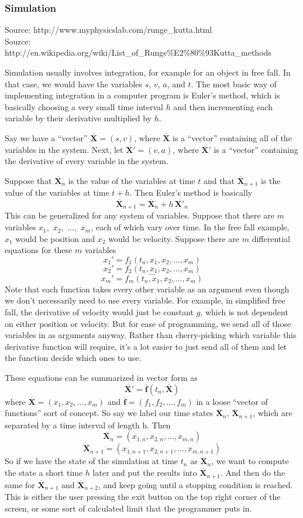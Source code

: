 \documentclass[12pt]{article}
\newcommand{\bfvec}[1]{\overline{\mathbf{#1}}}
\begin{document}
	\subsubsection*{Simulation}
	
	Source: http://www.myphysicslab.com/runge\_kutta.html \\
	Source: http://en.wikipedia.org/wiki/List\_of\_Runge\%E2\%80\%93Kutta\_methods
	
	Simulation usually involves integration, for example for an object in free fall. In that case, we would have the variables $s$, $v$, $a$, and $t$. The most basic way of implementing integration in a computer program is Euler's method, which is basically choosing a very small time interval $h$ and then incrementing each variable by their derivative multiplied by $h$.

	Say we have a ``vector'' $\bfvec{X} = (s, v)$, where $\bfvec{X}$ is a ``vector'' containing all of the variables in the system. Next, let $\bfvec{X'} = (v, a)$, where $\bfvec{X'}$ is a ``vector'' containing the derivative of every variable in the system.

	Suppose that $\bfvec{X}_n$ is the value of the variables at time $t$ and that $\bfvec{X}_{n+1}$ is the value of the variables at time $t+h$. Then Euler's method is basically
			$$\bfvec{X}_{n+1} = \bfvec{X}_n + h\,\bfvec{X'}_n$$			
	This can be generalized for any system of variables. Suppose that there are $m$ variables $x_1$,~$x_2$,~...,~$x_m$, each of which vary over time. In the free fall example, $x_1$ would be position and $x_2$ would be velocity. Suppose there are $m$ differential equations for these $m$ variables
			$$x_1' = f_1(t_n, x_1,x_2,...,x_m)$$
			$$x_2' = f_2(t_n, x_1,x_2,...,x_m)$$
			$$...$$
			$$x_m' = f_m(t_n, x_1,x_2,...,x_m)$$
	Note that each function takes every other variable as an argument even though we don't necessarily need to use every variable. For example, in simplified free fall, the derivative of velocity would just be constant $g$, which is not dependent on either position or velocity. But for ease of programming, we send all of those variables in as arguments anyway. Rather than cherry-picking which variable this derivative function will require, it's a lot easier to just send all of them and let the function decide which ones to use. 
	
	These equations can be summarized in vector form as
			$$\bfvec{X'} = \bfvec{f}(t_n, \bfvec{X})$$
	where $\bfvec{X} = (x_1,x_2,...,x_m)$ and $\bfvec{f}=(f_1,f_2,...,f_m)$ in a loose ``vector of functions'' sort of concept. So say we label our time states $\bfvec{X}_n$, $\bfvec{X}_{n+1}$, which are separated by a time interval of length h. Then
			$$\bfvec{X}_n = (x_{1,n}, x_{2,n}, ..., x_{m,n})$$
			$$\bfvec{X}_{n+1} = (x_{1,n+1}, x_{2,n+1}, ..., x_{m,n+1})$$
	So if we have the state of the simulation at time $t_n$ as $\bfvec{X}_n$, we want to compute the state a short time $h$ later and put the results into $\bfvec{X}_{n+1}$. And then do the same for $\bfvec{X}_{n+1}$ and $\bfvec{X}_{n+2}$, and keep going until a stopping condition is reached. This is either the user pressing the exit button on the top right corner of the screen, or some sort of calculated limit that the programmer puts in.
\end{document}

